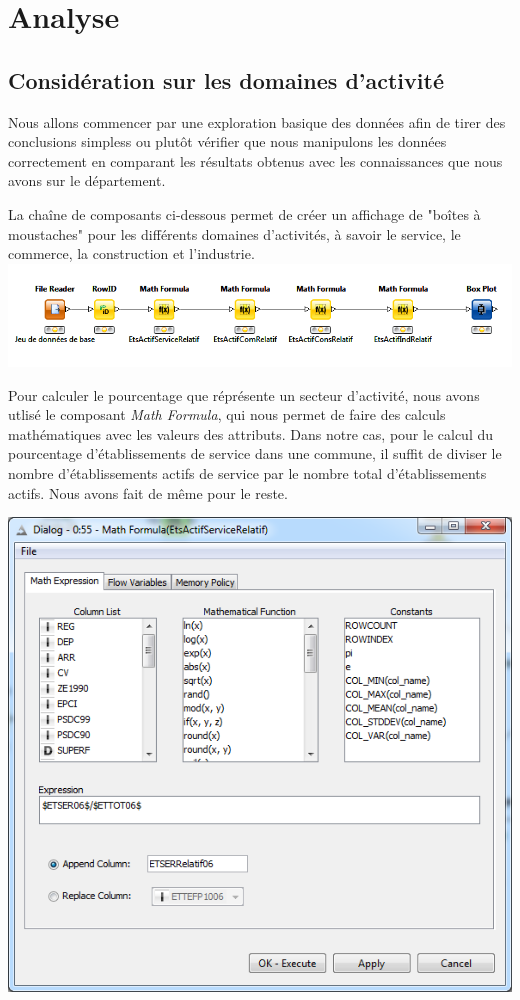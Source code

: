 \section{Analyse}

\subsection{Considération sur les domaines d'activité}

 Nous allons commencer par une exploration basique des données afin de tirer des conclusions simpless ou plutôt vérifier que nous manipulons les données correctement en comparant les résultats obtenus avec les connaissances que nous avons sur le département.

La chaîne de composants ci-dessous permet de créer un affichage de "boîtes à moustaches" pour les différents domaines d'activités, à savoir le service, le commerce, la construction et l'industrie.
\includegraphics{png/BoxPlotDomainesActivité_knime.png}

Pour calculer le pourcentage que réprésente un secteur d'activité, nous avons utlisé le composant \textit{Math Formula}, qui nous permet de faire des calculs mathématiques avec les valeurs des attributs. Dans notre cas, pour le calcul du pourcentage d'établissements de service dans une commune, il suffit de diviser le nombre d'établissements actifs de service par le nombre total d'établissements actifs. Nous avons fait de même pour le reste.

\includegraphics[width=15cm]{png/MathFormulaEtsActifServiceRelatif.png}

